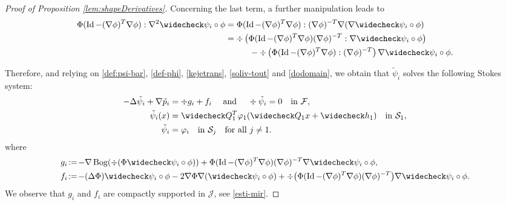 \documentclass[JEP,XML,SOM,Unicode, NoEqCountersInSection,NoFloatCountersInSection,published]{cedram}
\DeclareMathOperator{\Bog}{Bog}
\DeclareMathOperator{\Id}{Id}
\theoremstyle{definition}
\theoremstyle{remark}
\begin{document}
\begin{proof}[Proof of Proposition \ref{lem:shapeDerivatives}]
Concerning the last term, a further manipulation leads to
\begin{align*}
\Phi (\Id - (\nabla \phi)^T \nabla \phi) : \nabla^2 \widecheck \psi_i \circ \phi &= \Phi (\Id - (\nabla \phi)^T\nabla \phi) :(\nabla \phi)^{-T} \nabla(\nabla \widecheck \psi_i \circ \phi) \\
&= \div \left(\Phi (\Id - (\nabla \phi)^T \nabla \phi) (\nabla \phi)^{-T} : \nabla \widecheck \psi_i \circ \phi \right) \\
&\hspace*{1cm} - \div\left(\Phi (\Id - (\nabla \phi)^T\nabla \phi) : (\nabla \phi)^{-T} \right) \nabla \widecheck \psi_i \circ \phi.
\end{align*}

Therefore, and relying on \eqref{def:psi-bar}, \eqref{def-phi}, \eqref{kejetrans}, \eqref{soliv-tout} and
\eqref{dodomain},
we obtain that $\tilde \psi_i$ solves the following Stokes system:
\begin{subequations}
\label{subtilde}
\begin{align}
- \Delta \tilde \psi_i + \nabla \tilde p_i &= \div g_i + f_i \quad \text{ and } \quad \div \tilde \psi_i = 0 \quad \text{in } \mathcal F, \\
\tilde \psi_i (x) &= \widecheck Q_1^T \varphi_1(\widecheck Q_1 x + \widecheck h_1) \quad \text{in } \mathcal S_1, \\
\tilde \psi_i &= \varphi_i \quad \text{in } \mathcal S_j \quad \text{for all } j \neq 1.
\end{align}
\end{subequations}
where
\begin{align}
g_i &\!:=\! - \nabla \Bog (\div (\Phi \widecheck \psi_i \circ \phi)) + \Phi (\Id - (\nabla \phi)^T\nabla \phi) (\nabla \phi)^{-T} \nabla \widecheck \psi_i \circ \phi, \label{def:g_i}\\
f_i &\!:=\! -(\Delta \Phi) \widecheck \psi_i \circ \phi - 2 \nabla \Phi \nabla (\widecheck \psi_i \circ \phi)
+ \div\bigl(\Phi (\Id - (\nabla \phi)^T\nabla \phi) (\nabla \phi)^{-T} \bigr) \nabla \widecheck \psi_i \circ \phi. \label{def:f_i}
\end{align}
We observe that $g_i$ and $f_i$ are compactly supported in $ \mathcal J$, see \eqref{esti-mir}.


\end{proof}
\end{document}
